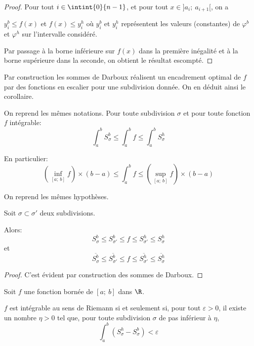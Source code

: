 \begin{proof}
Pour tout $i \in \intint{0}{n-1}$, et pour tout $x \in ]a_i;~a_{i+1}[$, on a

$y_i^b \leq f(x)$ et $f(x) \leq y_i^h$ où $y_i^b$ et $y_i^h$ représentent les valeurs (constantes) de $\varphi^b$ et $\varphi^h$ sur l'intervalle considéré.

Par passage à la borne inférieure sur $f(x)$ dans la première inégalité et à la borne supérieure dans la seconde, on obtient le résultat escompté.
\end{proof}

Par construction les sommes de Darboux réalisent un encadrement optimal de $f$ par des fonctions en escalier pour une subdivision donnée. On en déduit ainsi le corollaire.

\begin{cor}
On reprend les mêmes notations. Pour toute subdivision $\sigma$ et pour toute fonction $f$ intégrable:
\[
\displaystyle{\int_a^b}  S_\sigma^b  \leq \displaystyle{\int_a^b} f \leq \displaystyle{\int_a^b} S_\sigma^h
\]

En particulier:
\[
\left(\inf \limits_{[a;~b]} f\right) \times (b-a) \leq \displaystyle{\int_a^b} f  \leq \left(\sup \limits_{[a;~b]} f\right) \times (b-a)
\]
\end{cor}

\begin{prop}
On reprend les mêmes hypothèses.

Soit $\sigma \subset \sigma'$ deux subdivisions.

Alors:
\[
S_\sigma^b \leq S_{\sigma'}^b \leq f \leq S_{\sigma'}^h \leq S_{\sigma}^h
\]
et
\[
\overline{S_\sigma^b} \leq \overline{S_{\sigma'}^b} \leq f \leq \overline{S_{\sigma'}^h} \leq \overline{S_{\sigma}^h}
\]
\end{prop}

\begin{proof}
C'est évident par construction des sommes de Darboux.
\end{proof}

\begin{theo}
Soit $f$ une fonction bornée de $[a;~b]$ dans $\R$.

$f$ est intégrable au sens de Riemann si et seulement si, pour tout $\varepsilon > 0$, il existe un nombre $\eta > 0$ tel que, pour toute subdivision $\sigma$ de pas inférieur à $\eta$, 
\[
\displaystyle{\int_a^b} \left(S_\sigma^h - S_\sigma^b\right) < \varepsilon
\]
\end{theo}

